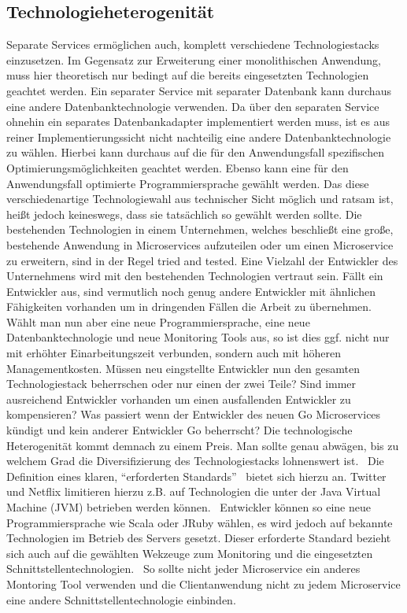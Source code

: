 \subsection{Technologieheterogenität}
Separate Services ermöglichen auch, komplett verschiedene Technologiestacks einzusetzen. Im Gegensatz zur Erweiterung einer monolithischen Anwendung, muss hier theoretisch nur bedingt auf die bereits eingesetzten Technologien geachtet werden. Ein separater Service mit separater Datenbank kann durchaus eine andere Datenbanktechnologie verwenden. Da über den separaten Service ohnehin ein separates Datenbankadapter implementiert werden muss, ist es aus reiner Implementierungssicht nicht nachteilig eine andere Datenbanktechnologie zu wählen. Hierbei kann durchaus auf die für den Anwendungsfall spezifischen Optimierungsmöglichkeiten geachtet werden. Ebenso kann eine für den Anwendungsfall optimierte Programmiersprache gewählt werden.
Das diese verschiedenartige Technologiewahl aus technischer Sicht möglich und ratsam ist, heißt jedoch keineswegs, dass sie tatsächlich so gewählt werden sollte. Die bestehenden Technologien in einem Unternehmen, welches beschließt eine große, bestehende Anwendung in Microservices aufzuteilen oder um einen Microservice zu erweitern, sind in der Regel tried and tested. Eine Vielzahl der Entwickler des Unternehmens wird mit den bestehenden Technologien vertraut sein. Fällt ein Entwickler aus, sind vermutlich noch genug andere Entwickler mit ähnlichen Fähigkeiten vorhanden um in dringenden Fällen die Arbeit zu übernehmen. Wählt man nun aber eine neue Programmiersprache, eine neue Datenbanktechnologie und neue Monitoring Tools aus, so ist dies ggf. nicht nur mit erhöhter Einarbeitungszeit verbunden, sondern auch mit höheren Managementkosten. Müssen neu eingstellte Entwickler nun den gesamten Technologiestack beherrschen oder nur einen der zwei Teile? Sind immer ausreichend Entwickler vorhanden um einen ausfallenden Entwickler zu kompensieren? Was passiert wenn der Entwickler des neuen Go Microservices kündigt und kein anderer Entwickler Go beherrscht? Die technologische Heterogenität kommt demnach zu einem Preis. Man sollte genau abwägen, bis zu welchem Grad die Diversifizierung des Technologiestacks lohnenswert ist.~\cite[vgl.][Seiten 5, 6]{newman2015building}
Die Definition eines klaren, ``erforderten Standards''~\cite[vgl.][Seiten 20, 21]{newman2015building} bietet sich hierzu an. Twitter und Netflix limitieren hierzu z.B. auf Technologien die unter der Java Virtual Machine (JVM) betrieben werden können.~\cite[][Seite 6]{newman2015building} Entwickler können so eine neue Programmiersprache wie Scala oder JRuby wählen, es wird jedoch auf bekannte Technologien im Betrieb des Servers gesetzt. Dieser erforderte Standard bezieht sich auch auf die gewählten Wekzeuge zum Monitoring und die eingesetzten Schnittstellentechnologien.~\cite[vgl.][Seite 21]{newman2015building} So sollte nicht jeder Microservice ein anderes Montoring Tool verwenden und die Clientanwendung nicht zu jedem Microservice eine andere Schnittstellentechnologie einbinden.

